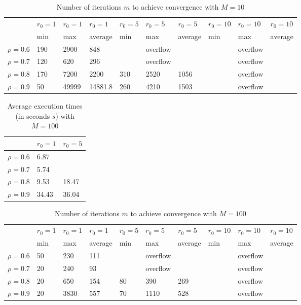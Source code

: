 \documentclass[a4paper,11pt,openright]{report}
\begin{document}
\begin{table}[H]
\centering
\addtolength{\leftskip}{-1.5cm}
\addtolength{\rightskip}{-1.5cm}
\begin{tabular}{|c|lllllllll|}
\hline
$ $ & $r_0 = 1$ & $r_0 = 1$ & $r_0 = 1$ & $r_0 = 5$ & $r_0 = 5$ & $r_0 = 5$ & $r_0 = 10$ & $r_0 = 10$ & $r_0 = 10$  \\
$ $ & min & max & average & min & max & average & min & max & average \\ 
\hline
$\rho = 0.6$ & 190 & 2900 & 848 &  & overflow &  &  & overflow &  \\

$\rho = 0.7$ & 120 & 620 & 296 &  & overflow &  &  & overflow &  \\

$\rho = 0.8$ & 170 & 7200 & 2200 & 310 & 2520 & 1056 &  & overflow &  \\

$\rho = 0.9$ & 50 & 49999 & 14881.8 & 260 & 4210 & 1503 &  & overflow &  \\
\hline
\end{tabular}
\caption{Number of iterations $m$ to achieve convergence with $M = 10$}
\end{table}
\begin{table}[H]
\centering
\addtolength{\leftskip}{-1.5cm}
\addtolength{\rightskip}{-1.5cm}
\begin{tabular}{|c|ll|}
\hline
$ $ & $r_0 = 1$ & $r_0 = 5$  \\
\hline
$\rho = 0.6$ & 6.87 & \\

$\rho = 0.7$ & 5.74 & \\

$\rho = 0.8$ & 9.53 & 18.47 \\

$\rho = 0.9$ & 34.43 & 36.04 \\
\hline
\end{tabular}
\caption{Average execution
 times (in seconds $s$) with $M = 100$}
\end{table}
\begin{table}[H]
\centering
\addtolength{\leftskip}{-1.5cm}
\addtolength{\rightskip}{-1.5cm}
\begin{tabular}{|c|lllllllll|}
\hline
$ $ & $r_0 = 1$ & $r_0 = 1$ & $r_0 = 1$ & $r_0 = 5$ & $r_0 = 5$ & $r_0 = 5$ & $r_0 = 10$ & $r_0 = 10$ & $r_0 = 10$  \\
$ $ & min & max & average & min & max & average & min & max & average \\ 
\hline
$\rho = 0.6$ & 50 & 230 & 111 &  & overflow &  &  & overflow &  \\

$\rho = 0.7$ & 20 & 240 & 93 &  & overflow &  &  & overflow &  \\

$\rho = 0.8$ & 20 & 650 & 154 & 80 & 390 & 269 &  & overflow &  \\

$\rho = 0.9$ & 20 & 3830 & 557 & 70 & 1110 & 528 &  & overflow &  \\
\hline
\end{tabular}
\caption{Number of iterations $m$ to achieve convergence with $M = 100$}
\end{table}
\end{document}
